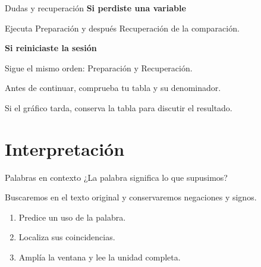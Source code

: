 \begin{frame}[label=recuperacion]{Dudas y recuperación}
\textbf{Si perdiste una variable}\par
  Ejecuta Preparación y después Recuperación de la comparación.\par
  \par\vspace{0.5cm}
  \textbf{Si reiniciaste la sesión}\par
  Sigue el mismo orden: Preparación y Recuperación.\par
  \par\vspace{0.5cm}
  Antes de continuar, comprueba tu tabla y su denominador.\par
  \par\vspace{0.2cm}
  Si el gráfico tarda, conserva la tabla para discutir el resultado.
\end{frame}

\section{Interpretación}

\begin{frame}[label=contexto]{Palabras en contexto}
  ¿La palabra significa lo que supusimos?
  \par\vspace{0.4cm}
  Buscaremos en el texto original y conservaremos negaciones y signos.
  \begin{enumerate}
    \item Predice un uso de la palabra.
    \item Localiza sus coincidencias.
    \item Amplía la ventana y lee la unidad completa.
  \end{enumerate}
\end{frame}

